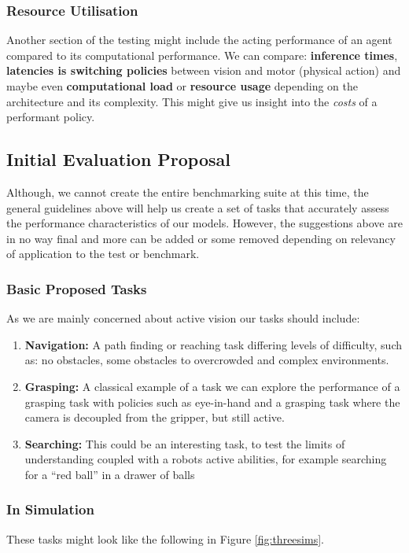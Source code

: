 \subsubsection{Resource Utilisation}
Another section of the testing might include the acting performance of an agent compared to its computational performance. We can compare: \textbf{inference times}, \textbf{latencies is switching policies} between vision and motor (physical action) and maybe even \textbf{computational load} or \textbf{resource usage} depending on the architecture and its complexity. This might give us insight into the \emph{costs} of a performant policy.

\subsection{Initial Evaluation Proposal}
Although, we cannot create the entire benchmarking suite at this time, the general guidelines above will help us create a set of tasks that accurately assess the performance characteristics of our models. However, the suggestions above are in no way final and more can be added or some removed depending on relevancy of application to the test or benchmark.

\subsubsection{Basic Proposed Tasks}
As we are mainly concerned about active vision our tasks should include:
\begin{enumerate}
  \item \textbf{Navigation:} A path finding or reaching task differing levels of difficulty, such as: no obstacles, some obstacles to overcrowded and complex environments.
  \item \textbf{Grasping:} A classical example of a task we can explore the performance of a grasping task with policies such as eye-in-hand and a grasping task where the camera is decoupled from the gripper, but still active.
  \item \textbf{Searching:} This could be an interesting task, to test the limits of understanding coupled with a robots active abilities, for example searching for a ``red ball'' in a drawer of balls
\end{enumerate}

\subsubsection{In Simulation}
These tasks might look like the following in Figure \ref{fig:threesims}.

